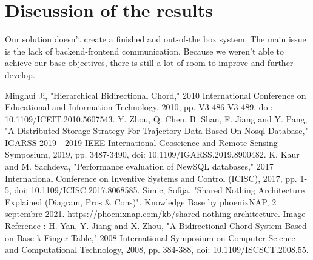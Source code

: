 \documentclass{article}
\begin{document}
\section{Discussion of the results}

Our solution doesn't create a finished and out-of-the box system. The main issue is the lack of backend-frontend communication. Because we weren't able to achieve our base objectives, there is still a lot of room to improve and further develop.


\pagebreak

\begin{thebibliography}{9}
Minghui Ji, "Hierarchical Bidirectional Chord," 2010 International Conference on Educational and Information Technology, 2010, pp. V3-486-V3-489, doi: 10.1109/ICEIT.2010.5607543.
Y. Zhou, Q. Chen, B. Shan, F. Jiang and Y. Pang, "A Distributed Storage Strategy For Trajectory Data Based On Nosql Database," IGARSS 2019 - 2019 IEEE International Geoscience and Remote Sensing Symposium, 2019, pp. 3487-3490, doi: 10.1109/IGARSS.2019.8900482.
K. Kaur and M. Sachdeva, "Performance evaluation of NewSQL databases," 2017 International Conference on Inventive Systems and Control (ICISC), 2017, pp. 1-5, doi: 10.1109/ICISC.2017.8068585.
Simic, Sofija, "Shared Nothing Architecture Explained (Diagram, Pros \& Cons)". Knowledge Base by phoenixNAP, 2 septembre 2021. https://phoenixnap.com/kb/shared-nothing-architecture.
Image Reference : H. Yan, Y. Jiang and X. Zhou, "A Bidirectional Chord System Based on Base-k Finger Table," 2008 International Symposium on Computer Science and Computational Technology, 2008, pp. 384-388, doi: 10.1109/ISCSCT.2008.55.
\end{thebibliography}

\pagebreak

\appendix
\end{document}
